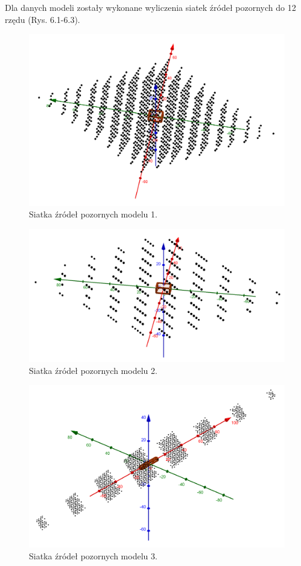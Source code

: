 Dla danych modeli zostały wykonane wyliczenia siatek źródeł pozornych do 12 rzędu (Rys. 6.1-6.3).

\begin{figure}[H]
        \centering
                \centering
                \includegraphics[width=12cm]{siatka1}
	\caption{Siatka źródeł pozornych modelu 1.}
\end{figure}

\begin{figure}[H]
        \centering
                \centering
                \includegraphics[width=12cm]{siatka2}
	\caption{Siatka źródeł pozornych modelu 2.}
\end{figure}

\begin{figure}[H]
        \centering
                \centering
                \includegraphics[width=12cm]{siatka3}
	\caption{Siatka źródeł pozornych modelu 3.}
\end{figure}


